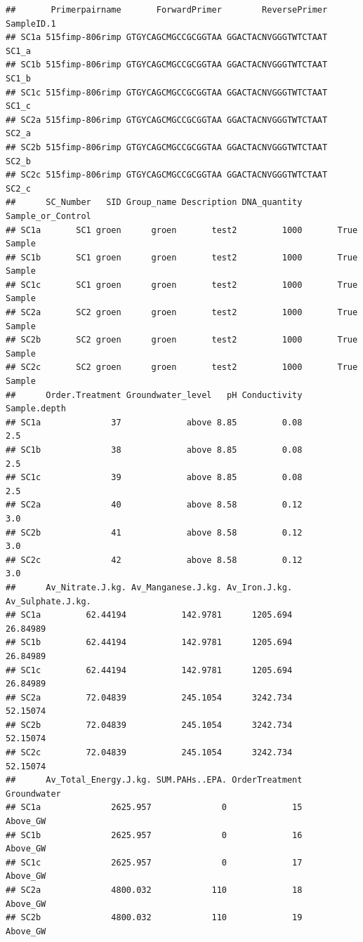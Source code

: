 \documentclass[
]{article}
\begin{document}
\begin{verbatim}
##       Primerpairname       ForwardPrimer        ReversePrimer SampleID.1
## SC1a 515fimp-806rimp GTGYCAGCMGCCGCGGTAA GGACTACNVGGGTWTCTAAT      SC1_a
## SC1b 515fimp-806rimp GTGYCAGCMGCCGCGGTAA GGACTACNVGGGTWTCTAAT      SC1_b
## SC1c 515fimp-806rimp GTGYCAGCMGCCGCGGTAA GGACTACNVGGGTWTCTAAT      SC1_c
## SC2a 515fimp-806rimp GTGYCAGCMGCCGCGGTAA GGACTACNVGGGTWTCTAAT      SC2_a
## SC2b 515fimp-806rimp GTGYCAGCMGCCGCGGTAA GGACTACNVGGGTWTCTAAT      SC2_b
## SC2c 515fimp-806rimp GTGYCAGCMGCCGCGGTAA GGACTACNVGGGTWTCTAAT      SC2_c
##      SC_Number   SID Group_name Description DNA_quantity Sample_or_Control
## SC1a       SC1 groen      groen       test2         1000       True Sample
## SC1b       SC1 groen      groen       test2         1000       True Sample
## SC1c       SC1 groen      groen       test2         1000       True Sample
## SC2a       SC2 groen      groen       test2         1000       True Sample
## SC2b       SC2 groen      groen       test2         1000       True Sample
## SC2c       SC2 groen      groen       test2         1000       True Sample
##      Order.Treatment Groundwater_level   pH Conductivity Sample.depth
## SC1a              37             above 8.85         0.08          2.5
## SC1b              38             above 8.85         0.08          2.5
## SC1c              39             above 8.85         0.08          2.5
## SC2a              40             above 8.58         0.12          3.0
## SC2b              41             above 8.58         0.12          3.0
## SC2c              42             above 8.58         0.12          3.0
##      Av_Nitrate.J.kg. Av_Manganese.J.kg. Av_Iron.J.kg. Av_Sulphate.J.kg.
## SC1a         62.44194           142.9781      1205.694          26.84989
## SC1b         62.44194           142.9781      1205.694          26.84989
## SC1c         62.44194           142.9781      1205.694          26.84989
## SC2a         72.04839           245.1054      3242.734          52.15074
## SC2b         72.04839           245.1054      3242.734          52.15074
## SC2c         72.04839           245.1054      3242.734          52.15074
##      Av_Total_Energy.J.kg. SUM.PAHs..EPA. OrderTreatment Groundwater
## SC1a              2625.957              0             15    Above_GW
## SC1b              2625.957              0             16    Above_GW
## SC1c              2625.957              0             17    Above_GW
## SC2a              4800.032            110             18    Above_GW
## SC2b              4800.032            110             19    Above_GW

\end{verbatim}
\end{document}
